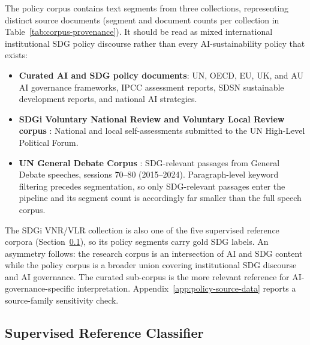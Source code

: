 \documentclass[12pt,a4paper]{article}
\begin{document}
The policy corpus contains text segments from three collections, representing distinct source documents (segment and document counts per collection in Table~\ref{tab:corpus-provenance}). It should be read as mixed international institutional SDG policy discourse rather than every AI-sustainability policy that exists:
\begin{itemize}
  \item \textbf{Curated AI and SDG policy documents}: UN, OECD, EU, UK, and AU AI governance frameworks, IPCC assessment reports, SDSN sustainable development reports, and national AI strategies.
  \item \textbf{SDGi Voluntary National Review and Voluntary Local Review corpus} \parencite{SDGi2024}: National and local self-assessments submitted to the UN High-Level Political Forum.
  \item \textbf{UN General Debate Corpus} \parencite{JankinEtAl2024}: SDG-relevant passages from General Debate speeches, sessions 70--80 (2015--2024). Paragraph-level keyword filtering precedes segmentation, so only SDG-relevant passages enter the pipeline and its segment count is accordingly far smaller than the full speech corpus.
\end{itemize}
The SDGi VNR/VLR collection is also one of the five supervised reference corpora (Section~\ref{sec:supervised-classifier}), so its policy segments carry gold SDG labels.
An asymmetry follows: the research corpus is an intersection of AI and SDG content while the policy corpus is a broader union covering institutional SDG discourse and AI governance. The curated sub-corpus is the more relevant reference for AI-governance-specific interpretation. Appendix~\ref{app:policy-source-data} reports a source-family sensitivity check.

\subsection{Supervised Reference Classifier}\label{sec:supervised-classifier}
\end{document}
